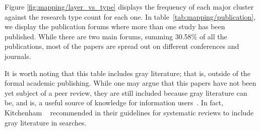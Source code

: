 Figure \ref{fig:mapping/layer_vs_type} displays the frequency of each major cluster
against the research type count for each one. In table~\ref{tab:mapping/publication},
we display the publication forums where more than one study has been published.
While there are two main forums, summing 30.58\% of all the publications,
most of the papers are spread out on different conferences and journals.

It is worth noting that this table includes gray literature; that is, outside of the
formal academic publishing.
While one may argue that this papers have not been yet subject of a peer
review, they are still included because gray literature can be, and is, a useful
source of knowledge for information users~\cite{Lawrence2015}. In fact,
Kitchenham \etal~\cite{Kitchenham2007} recommended in their guidelines for systematic
reviews to include gray literature in searches.

